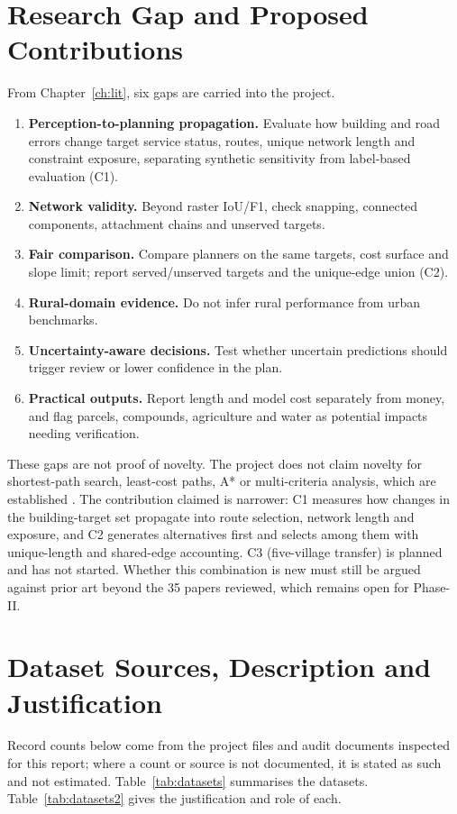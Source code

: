\documentclass[12pt,a4paper]{report}
\begin{document}
\chapter{Research Gap and Proposed Contributions}
From Chapter~\ref{ch:lit}, six gaps are carried into the project.
\begin{enumerate}[nosep]
\item \textbf{Perception-to-planning propagation.} Evaluate how building and road errors change target service status, routes, unique network length and constraint exposure, separating synthetic sensitivity from label-based evaluation (C1).
\item \textbf{Network validity.} Beyond raster IoU/F1, check snapping, connected components, attachment chains and unserved targets.
\item \textbf{Fair comparison.} Compare planners on the same targets, cost surface and slope limit; report served/unserved targets and the unique-edge union (C2).
\item \textbf{Rural-domain evidence.} Do not infer rural performance from urban benchmarks.
\item \textbf{Uncertainty-aware decisions.} Test whether uncertain predictions should trigger review or lower confidence in the plan.
\item \textbf{Practical outputs.} Report length and model cost separately from money, and flag parcels, compounds, agriculture and water as potential impacts needing verification.
\end{enumerate}
These gaps are not proof of novelty. The project does not claim novelty for shortest-path search, least-cost paths, A* or multi-criteria analysis, which are established \cite{F01,F02,F04,F03}. The contribution claimed is narrower: C1 measures how changes in the building-target set propagate into route selection, network length and exposure, and C2 generates alternatives first and selects among them with unique-length and shared-edge accounting. C3 (five-village transfer) is planned and has not started. Whether this combination is new must still be argued against prior art beyond the 35 papers reviewed, which remains open for Phase-II.

\chapter{Dataset Sources, Description and Justification}\label{ch:data}
Record counts below come from the project files and audit documents inspected for this report; where a count or source is not documented, it is stated as such and not estimated. Table~\ref{tab:datasets} summarises the datasets. Table~\ref{tab:datasets2} gives the justification and role of each.
\end{document}
